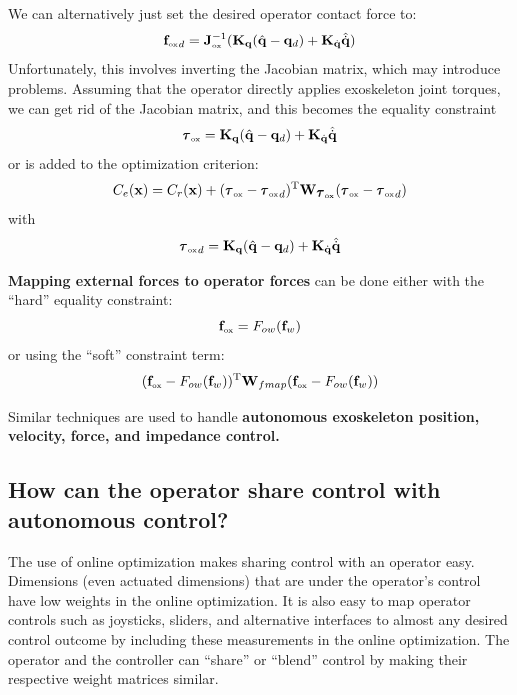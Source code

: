 \documentclass[letterpaper,12pt,fullpage]{article}
\newcommand{\ox}{{\mbox {\tiny ox}}}
\begin{document}
We can alternatively just set the desired operator contact force to:
\begin{equation}
{\vf_{\ox}}_d = \mJ_{\ox}^{-1} ( \mK_{\vq}( \hat{\vq} - \vq_d ) + \mK_{\dot{\vq}} \hat{\dot{\vq}} )
\end{equation}
Unfortunately, this involves inverting the Jacobian matrix, which may introduce
problems.
Assuming that the operator directly applies exoskeleton joint torques, 
we can get rid of the Jacobian matrix, and this becomes
the equality constraint
\begin{equation}
\vtau_{\ox} = \mK_{\vq}( \hat{\vq} - \vq_d ) + \mK_{\dot{\vq}} \hat{\dot{\vq}}
\end{equation}
or is added to the optimization criterion:
\begin{equation}
C_e(\vx) = C_r(\vx) 
+ (\vtau_{\ox} - {\vtau_{\ox}}_d)^{\tr} \mW_{\vtau_{\ox}} (\vtau_{\ox} - {\vtau_{\ox}}_d)
\end{equation}
with
\begin{equation}
{\vtau_{\ox}}_d = \mK_{\vq}( \hat{\vq} - \vq_d ) + \mK_{\dot{\vq}} \hat{\dot{\vq}}
\end{equation}

{\bf Mapping external forces to operator forces} can be done either with the
``hard'' equality constraint:
\begin{equation}
\vf_{\ox} = F_{ow} ( \vf_w )
\end{equation}
or using the ``soft'' constraint term:
\begin{equation}
(\vf_{\ox} - F_{ow} ( \vf_w ))^\tr \mW_{fmap}  (\vf_{\ox} - F_{ow} ( \vf_w ))
\end{equation}

Similar techniques are used to handle {\bf autonomous exoskeleton position, velocity,
force, and impedance control.}

\subsection{How can the operator share control with autonomous control?}

The use of online optimization makes sharing control with an operator easy.
Dimensions (even actuated dimensions) that are under the operator's control have
low weights in the online optimization. It is also easy to map operator controls
such as joysticks, sliders, and alternative interfaces to almost any desired
control outcome by including these measurements in the online optimization.
The operator and the controller can ``share'' or ``blend''
control by making their respective
weight matrices similar.
\end{document}
